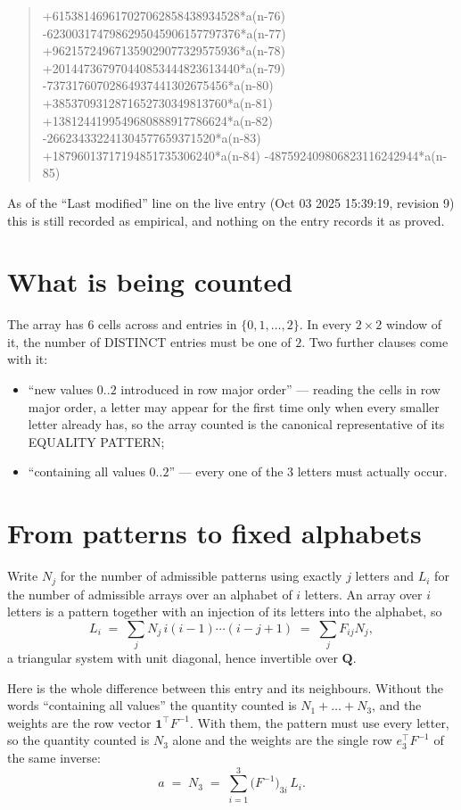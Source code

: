 \documentclass[11pt,a4paper]{article}
\theoremstyle{plain}
\theoremstyle{definition}
\begin{document}
\begin{quote}
+615381469617027062858438934528*a(n-76) -6230031747986295045906157797376*a(n-77) +962157249671359029077329575936*a(n-78) +201447367970440853444823613440*a(n-79) -73731760702864937441302675456*a(n-80) +3853709312871652730349813760*a(n-81) +1381244199549680888917786624*a(n-82) -266234332241304577659371520*a(n-83) +18796013717194851735306240*a(n-84) -487592409806823116242944*a(n-85)
\end{quote}
As of the ``Last modified'' line on the live entry (Oct 03 2025 15:39:19, revision 9) this is still
recorded as empirical, and nothing on the entry records it as proved.

\section{What is being counted}

The array has $6$ cells across and entries in $\{0,1,\dots,2\}$. In every
$2\times2$ window of it, the number of DISTINCT entries must be one of $2$. Two
further clauses come with it:

\begin{itemize}
\item ``new values $0..2$ introduced in row major order'' --- reading the cells in row major
order, a letter may appear for the first time only when every smaller letter already has, so
the array counted is the canonical representative of its EQUALITY PATTERN;
\item ``containing all values $0..2$'' --- every one of the $3$ letters must actually
occur.
\end{itemize}


\section{From patterns to fixed alphabets}

Write $N_j$ for the number of admissible patterns using exactly $j$ letters and $L_i$ for the
number of admissible arrays over an alphabet of $i$ letters. An array over $i$ letters is a
pattern together with an injection of its letters into the alphabet, so
\[
L_i\;=\;\sum_{j} N_j\,i(i-1)\cdots(i-j+1)\;=\;\sum_j F_{ij}N_j ,
\]
a triangular system with unit diagonal, hence invertible over $\mathbf{Q}$.

Here is the whole difference between this entry and its neighbours. Without the words
``containing all values'' the quantity counted is $N_1+\dots+N_{3}$, and the weights are
the row vector $\mathbf{1}^{\!\top}F^{-1}$. With them, the pattern must use every letter,
so the quantity counted is $N_{3}$ alone and the weights are the single row
$e_{3}^{\!\top}F^{-1}$ of the same inverse:
\[
a\;=\;N_{3}\;=\;\sum_{i=1}^{3}\bigl(F^{-1}\bigr)_{3i}\,L_i .
\]
\end{document}
